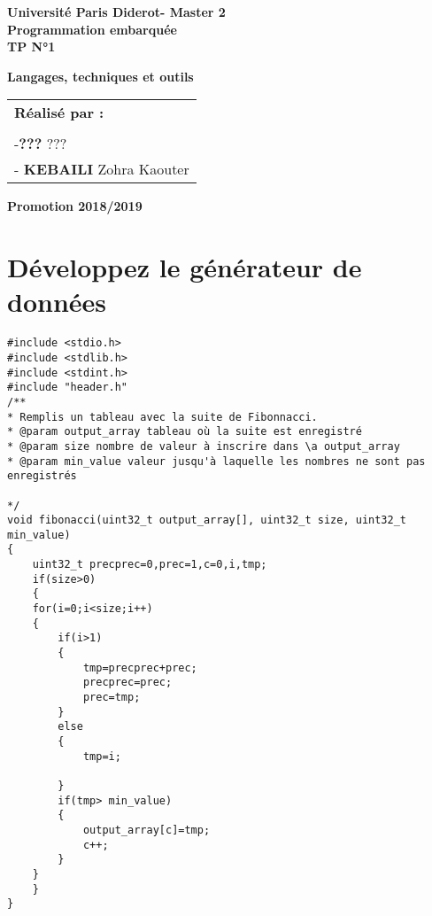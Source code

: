 \documentclass[12pt,a4paper]{article}
\begin{document}
\begin{center}

 
  
 
   \large
  	\vspace{2cm}
  \textbf{Université Paris Diderot- Master 2}\\
  \vspace{1cm}
  \LARGE
  \textbf{Programmation embarquée}\\
   \vspace*{1cm}
\LARGE
  \textbf{TP N°1}
 
  \large
  \LARGE
  \setlength{\fboxsep}{0.5cm}
  \begin{framed}
	\textbf{Langages, techniques et outils}
  \end{framed}
  \vspace{2cm}
\begin{table}[H]
   \setlength{\tabcolsep}{2cm}
    \large
	\centering
	\begin{tabular}{l}
		\textbf{Réalisé par :}    
		 \\  \\
		 -\textbf{???} ???\\
		- \textbf{ KEBAILI } Zohra Kaouter\\
	
	
		
  

	\end{tabular}
  \end{table}
  \vspace{\fill}
  \large
  \textbf{Promotion 2018/2019}
   \end{center}
\newpage
\section{Développez le générateur de données}

\begin{verbatim}
#include <stdio.h>
#include <stdlib.h>
#include <stdint.h>
#include "header.h"
/**
* Remplis un tableau avec la suite de Fibonnacci.
* @param output_array tableau où la suite est enregistré
* @param size nombre de valeur à inscrire dans \a output_array
* @param min_value valeur jusqu'à laquelle les nombres ne sont pas enregistrés

*/
void fibonacci(uint32_t output_array[], uint32_t size, uint32_t min_value)
{
	uint32_t precprec=0,prec=1,c=0,i,tmp;
	if(size>0)
	{
	for(i=0;i<size;i++)
	{
		if(i>1)
		{
			tmp=precprec+prec;
			precprec=prec;
			prec=tmp;
		}
		else
		{
			tmp=i;

		}
		if(tmp> min_value)
		{
			output_array[c]=tmp;
			c++;
		}
	}
	}
}

\end{verbatim}
\end{document}
